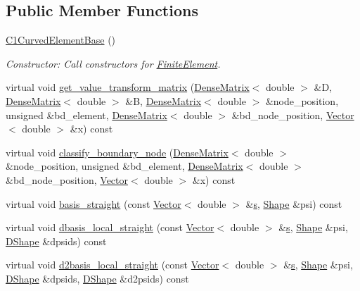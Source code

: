 \subsection*{Public Member Functions}
\begin{DoxyCompactItemize}
\item 
\hyperlink{classoomph_1_1C1CurvedElementBase_acf744418145e719529ce0f09746976d3}{C1\+Curved\+Element\+Base} ()
\begin{DoxyCompactList}\small\item\em Constructor\+: Call constructors for \hyperlink{classoomph_1_1FiniteElement}{Finite\+Element}. \end{DoxyCompactList}\item 
virtual void \hyperlink{classoomph_1_1C1CurvedElementBase_a4735f6f63d4e545608bf485c7168e251}{get\+\_\+value\+\_\+transform\+\_\+matrix} (\hyperlink{classoomph_1_1DenseMatrix}{Dense\+Matrix}$<$ double $>$ \&D, \hyperlink{classoomph_1_1DenseMatrix}{Dense\+Matrix}$<$ double $>$ \&B, \hyperlink{classoomph_1_1DenseMatrix}{Dense\+Matrix}$<$ double $>$ \&node\+\_\+position, unsigned \&bd\+\_\+element, \hyperlink{classoomph_1_1DenseMatrix}{Dense\+Matrix}$<$ double $>$ \&bd\+\_\+node\+\_\+position, \hyperlink{classoomph_1_1Vector}{Vector}$<$ double $>$ \&x) const
\item 
virtual void \hyperlink{classoomph_1_1C1CurvedElementBase_ada5b9e50a71fd3e9d3975c78b5c3ed52}{classify\+\_\+boundary\+\_\+node} (\hyperlink{classoomph_1_1DenseMatrix}{Dense\+Matrix}$<$ double $>$ \&node\+\_\+position, unsigned \&bd\+\_\+element, \hyperlink{classoomph_1_1DenseMatrix}{Dense\+Matrix}$<$ double $>$ \&bd\+\_\+node\+\_\+position, \hyperlink{classoomph_1_1Vector}{Vector}$<$ double $>$ \&x) const
\item 
virtual void \hyperlink{classoomph_1_1C1CurvedElementBase_a256c9d25d9f4c9067914b39d1cc4c6fa}{basis\+\_\+straight} (const \hyperlink{classoomph_1_1Vector}{Vector}$<$ double $>$ \&\hyperlink{cfortran_8h_ab7123126e4885ef647dd9c6e3807a21c}{s}, \hyperlink{classoomph_1_1Shape}{Shape} \&psi) const
\item 
virtual void \hyperlink{classoomph_1_1C1CurvedElementBase_a284de72597bf65588e53eb0b4516fa0b}{dbasis\+\_\+local\+\_\+straight} (const \hyperlink{classoomph_1_1Vector}{Vector}$<$ double $>$ \&\hyperlink{cfortran_8h_ab7123126e4885ef647dd9c6e3807a21c}{s}, \hyperlink{classoomph_1_1Shape}{Shape} \&psi, \hyperlink{classoomph_1_1DShape}{D\+Shape} \&dpsids) const
\item 
virtual void \hyperlink{classoomph_1_1C1CurvedElementBase_a5d919ef0eef6ae6477642b3dcd1196df}{d2basis\+\_\+local\+\_\+straight} (const \hyperlink{classoomph_1_1Vector}{Vector}$<$ double $>$ \&\hyperlink{cfortran_8h_ab7123126e4885ef647dd9c6e3807a21c}{s}, \hyperlink{classoomph_1_1Shape}{Shape} \&psi, \hyperlink{classoomph_1_1DShape}{D\+Shape} \&dpsids, \hyperlink{classoomph_1_1DShape}{D\+Shape} \&d2psids) const

\end{DoxyCompactItemize}
